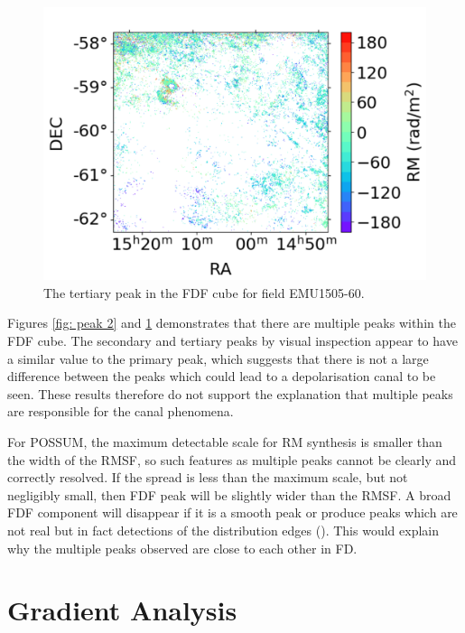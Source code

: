 \begin{figure}
    \centering
    \includegraphics[width=\linewidth]{Thesis_Template/Figures/Peak 3.png}
    \caption{The tertiary peak in the FDF cube for field EMU1505-60.}
    \label{fig: peak 3}
\end{figure}

Figures \ref{fig: peak 2} and \ref{fig: peak 3} demonstrates that there are multiple peaks within the FDF cube. The secondary and tertiary peaks by visual inspection appear to have a similar value to the primary peak, which suggests that there is not a large difference between the peaks which could lead to a depolarisation canal to be seen. These results therefore do not support the explanation that multiple peaks are responsible for the canal phenomena.

For POSSUM, the maximum detectable scale for RM synthesis is smaller than the width of the RMSF, so such features as multiple peaks cannot be clearly and correctly resolved. If the spread is less than the maximum scale, but not negligibly small, then FDF peak will be slightly wider than the RMSF. A broad FDF component will disappear if it is a smooth peak or produce peaks which are not real but in fact detections of the distribution edges (\cite{Erceg_2022}). This would explain why the multiple peaks observed are close to each other in FD.

\section{Gradient Analysis}
\label{grad analysis}

